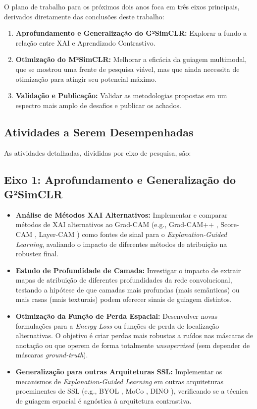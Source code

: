 O plano de trabalho para os próximos dois anos foca em três eixos principais, derivados diretamente das conclusões deste trabalho:
\begin{enumerate}
    \item \textbf{Aprofundamento e Generalização do G²SimCLR:} Explorar a fundo a relação entre XAI e Aprendizado Contrastivo.
    \item \textbf{Otimização do M²SimCLR:} Melhorar a eficácia da guiagem multimodal, que se mostrou uma frente de pesquisa viável, mas que ainda necessita de otimização para atingir seu potencial máximo.
    \item \textbf{Validação e Publicação:} Validar as metodologias propostas em um espectro mais amplo de desafios e publicar os achados.
\end{enumerate}

\subsection{Atividades a Serem Desempenhadas}

As atividades detalhadas, divididas por eixo de pesquisa, são:

\subsection{Eixo 1: Aprofundamento e Generalização do G²SimCLR}
\begin{itemize}
    \item \textbf{Análise de Métodos XAI Alternativos:} Implementar e comparar métodos de XAI alternativos ao Grad-CAM (e.g., Grad-CAM++ \cite{gradcamplusplus}, Score-CAM \cite{epg_score}, Layer-CAM \cite{layercam}) como fontes de sinal para o \textit{Explanation-Guided Learning}, avaliando o impacto de diferentes métodos de atribuição na robustez final.
    \item \textbf{Estudo de Profundidade de Camada:} Investigar o impacto de extrair mapas de atribuição de diferentes profundidades da rede convolucional, testando a hipótese de que camadas mais profundas (mais semânticas) ou mais rasas (mais texturais) podem oferecer sinais de guiagem distintos.
    \item \textbf{Otimização da Função de Perda Espacial:} Desenvolver novas formulações para a \textit{Energy Loss} ou funções de perda de localização alternativas. O objetivo é criar perdas mais robustas a ruídos nas máscaras de anotação ou que operem de forma totalmente \textit{unsupervised} (sem depender de máscaras \textit{ground-truth}).
    \item \textbf{Generalização para outras Arquiteturas SSL:} Implementar os mecanismos de \textit{Explanation-Guided Learning} em outras arquiteturas proeminentes de SSL (e.g., BYOL \cite{byol}, MoCo \cite{moco}, DINO \cite{dino}), verificando se a técnica de guiagem espacial é agnóstica à arquitetura contrastiva.
\end{itemize}

